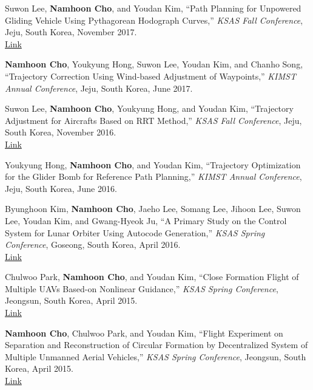 \begin{enumerate}[itemsep=0.5em, label={[}NC\arabic*{]}]
\item Suwon Lee, \textbf{Namhoon Cho}, and Youdan Kim, ``Path Planning for Unpowered Gliding Vehicle Using Pythagorean Hodograph Curves,'' \textit{KSAS Fall Conference}, Jeju, South Korea, November 2017. \\
\href{https://www.dbpia.co.kr/journal/articleDetail?nodeId=NODE07366932}{Link}

\item \textbf{Namhoon Cho}, Youkyung Hong, Suwon Lee, Youdan Kim, and Chanho Song, ``Trajectory Correction Using Wind-based Adjustment of Waypoints,'' \textit{KIMST Annual Conference}, Jeju, South Korea, June 2017. 

\item Suwon Lee, \textbf{Namhoon Cho}, Youkyung Hong, and Youdan Kim, ``Trajectory Adjustment for Aircrafts Based on RRT Method,'' \textit{KSAS Fall Conference}, Jeju, South Korea, November 2016. \\
\href{https://www.dbpia.co.kr/journal/articleDetail?nodeId=NODE07090427}{Link}

\item Youkyung Hong, \textbf{Namhoon Cho}, and Youdan Kim, ``Trajectory Optimization for the Glider Bomb for Reference Path Planning,'' \textit{KIMST Annual Conference}, Jeju, South Korea, June 2016. 

\item Byunghoon Kim, \textbf{Namhoon Cho}, Jaeho Lee, Somang Lee, Jihoon Lee, Suwon Lee, Youdan Kim, and Gwang-Hyeok Ju, ``A Primary Study on the Control System for Lunar Orbiter Using Autocode Generation,'' \textit{KSAS Spring Conference}, Goseong, South Korea, April 2016. \\
\href{https://www.dbpia.co.kr/journal/articleDetail?nodeId=NODE07068032}{Link}

\item Chulwoo Park, \textbf{Namhoon Cho}, and Youdan Kim, ``Close Formation Flight of Multiple UAVs Based-on Nonlinear Guidance,'' \textit{KSAS Spring Conference}, Jeongsun, South Korea, April 2015. \\
\href{https://www.dbpia.co.kr/journal/articleDetail?nodeId=NODE06591153}{Link}

\item \textbf{Namhoon Cho}, Chulwoo Park, and Youdan Kim, ``Flight Experiment on Separation and Reconstruction of Circular Formation by Decentralized System of Multiple Unmanned Aerial Vehicles,'' \textit{KSAS Spring Conference}, Jeongsun, South Korea, April 2015. \\
\href{https://www.dbpia.co.kr/journal/articleDetail?nodeId=NODE06591221}{Link}


\end{enumerate}
